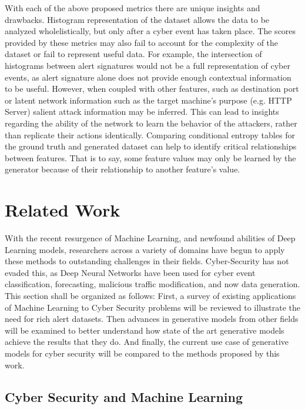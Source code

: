 \documentclass[12pt,american]{report}
\begin{document}
With each of the above proposed metrics there are unique insights and drawbacks. Histogram representation of the dataset allows the data to be analyzed wholelistically, but only after a cyber event has taken place. The scores provided by these metrics may also fail to account for the complexity of the dataset or fail to represent useful data. For example, the intersection of histograms between alert signatures would not be a full representation of cyber events, as alert signature alone does not provide enough contextual information to be useful. However, when coupled with other features, such as destination port or latent network information such as the target machine's purpose (e.g. HTTP Server) salient attack information may be inferred. This can lead to insights regarding the ability of the network to learn the behavior of the attackers, rather than replicate their actions identically. Comparing conditional entropy tables for the ground truth and generated dataset can help to identify critical relationships between features. That is to say, some feature values may only be learned by the generator because of their relationship to another feature's value.

\chapter{Related Work}

With the recent resurgence of Machine Learning, and newfound abilities of Deep Learning models, researchers across a variety of domains have begun to apply these methods to outstanding challenges in their fields. Cyber-Security has not evaded this, as Deep Neural Networks have been used for cyber event classification, forecasting, malicious traffic modification, and now data generation. This section shall be organized as follows: First, a survey of existing applications of Machine Learning to Cyber Security problems will be reviewed to illustrate the need for rich alert datasets. Then advances in generative models from other fields will be examined to better understand how state of the art generative models achieve the results that they do. And finally, the current use case of generative models for cyber security will be compared to the methods proposed by this work. 

\section{Cyber Security and Machine Learning}
\end{document}
